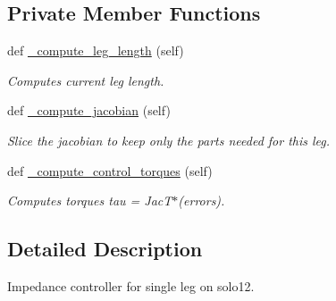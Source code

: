 \subsection*{Private Member Functions}
\begin{DoxyCompactItemize}
\item 
def \hyperlink{classpython_1_1dg__tools_1_1leg__impedance__control_1_1solo12__impedance__controller_1_1Solo12LegImpedanceController_a304acaa7c8804da7b9c5421bf9f1eb67}{\+\_\+compute\+\_\+leg\+\_\+length} (self)\hypertarget{classpython_1_1dg__tools_1_1leg__impedance__control_1_1solo12__impedance__controller_1_1Solo12LegImpedanceController_a304acaa7c8804da7b9c5421bf9f1eb67}{}\label{classpython_1_1dg__tools_1_1leg__impedance__control_1_1solo12__impedance__controller_1_1Solo12LegImpedanceController_a304acaa7c8804da7b9c5421bf9f1eb67}

\begin{DoxyCompactList}\small\item\em Computes current leg length. \end{DoxyCompactList}\item 
def \hyperlink{classpython_1_1dg__tools_1_1leg__impedance__control_1_1solo12__impedance__controller_1_1Solo12LegImpedanceController_a4cd43033ff5ac89001656ccb968c2c14}{\+\_\+compute\+\_\+jacobian} (self)
\begin{DoxyCompactList}\small\item\em Slice the jacobian to keep only the parts needed for this leg. \end{DoxyCompactList}\item 
def \hyperlink{classpython_1_1dg__tools_1_1leg__impedance__control_1_1solo12__impedance__controller_1_1Solo12LegImpedanceController_a76309b4d0de6543fa99768e34e6f8844}{\+\_\+compute\+\_\+control\+\_\+torques} (self)\hypertarget{classpython_1_1dg__tools_1_1leg__impedance__control_1_1solo12__impedance__controller_1_1Solo12LegImpedanceController_a76309b4d0de6543fa99768e34e6f8844}{}\label{classpython_1_1dg__tools_1_1leg__impedance__control_1_1solo12__impedance__controller_1_1Solo12LegImpedanceController_a76309b4d0de6543fa99768e34e6f8844}

\begin{DoxyCompactList}\small\item\em Computes torques tau = Jac\+T$\ast$(errors). \end{DoxyCompactList}\end{DoxyCompactItemize}


\subsection{Detailed Description}
Impedance controller for single leg on solo12. 



